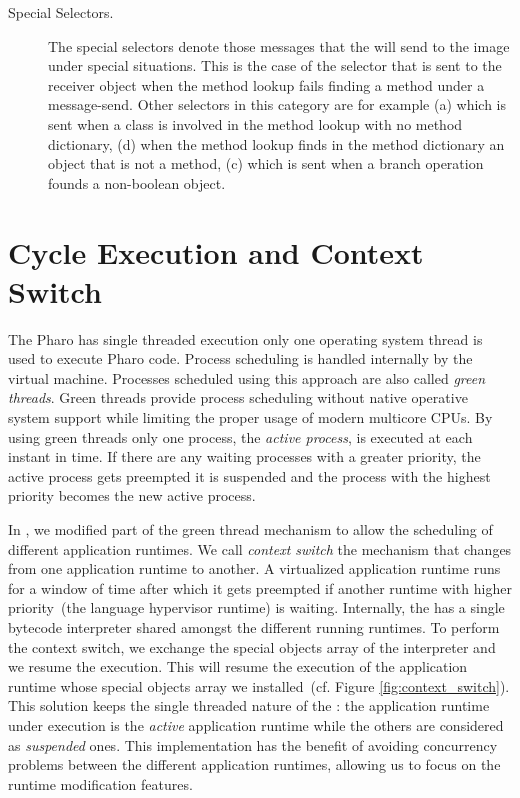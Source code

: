 \begin{description}
\item[Special Selectors.] The special selectors denote those messages that the \VM will send to the image under special situations. This is the case of the  selector that is sent to the receiver object when the method lookup fails finding a method under a message-send. Other selectors in this category are for example (a)  which is sent when a class is involved in the method lookup with no method dictionary, (d)  when the method lookup finds in the method dictionary an object that is not a method, (c)  which is sent when a branch operation founds a non-boolean object.

\end{description}




\section{Cycle Execution and Context Switch} \label{sec:context_switch}

The Pharo \VM has single threaded execution \ie only one operating system thread is used to execute Pharo code. Process scheduling is handled internally by the virtual machine. Processes scheduled using this approach are also called \emph{green threads}. Green threads provide process scheduling without native operative system support while limiting the proper usage of modern multicore CPUs. By using green threads only one process, the \emph{active process}, is executed at each instant in time. If there are any waiting processes with a greater priority, the active process gets preempted \ie it is suspended and the process with the highest priority becomes the new active process.

In \Vtt, we modified part of the green thread mechanism to allow the scheduling of different application runtimes. We call \emph{context switch} the mechanism that changes from one application runtime to another. A virtualized application runtime runs for a window of time after which it gets preempted if another runtime with higher priority~(the language hypervisor runtime) is waiting. Internally, the \VM has a single bytecode interpreter shared amongst the different running runtimes. To perform the context switch, we exchange the special objects array of the \VM interpreter and we resume the \VM execution. This will resume the execution of the application runtime whose special objects array we installed~(cf. Figure \ref{fig:context_switch}). This solution keeps the single threaded nature of the \VM: the application runtime under execution is the \emph{active} application runtime while the others are considered as \emph{suspended} ones. This implementation has the benefit of avoiding concurrency problems between the different application runtimes, allowing us to focus on the runtime modification features.

